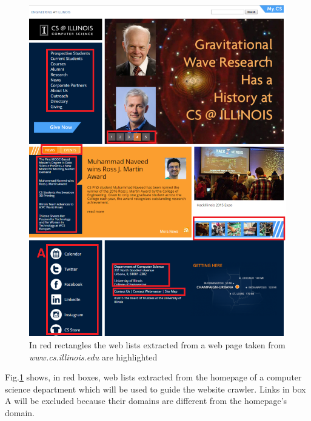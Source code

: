 \begin{figure}
\centering
\includegraphics*[scale=0.48]{./imgs/chap_4/weblists}
\caption{In red rectangles the web lists extracted from a web page taken from \textit{www.cs.illinois.edu} are highlighted }
\label{fig:1}
\end{figure}




Fig.\ref{fig:1} shows, in red boxes, web lists extracted from the homepage of a computer science department which will be used to guide the website crawler. Links in box A will be excluded because their domains are different from the homepage's domain.

